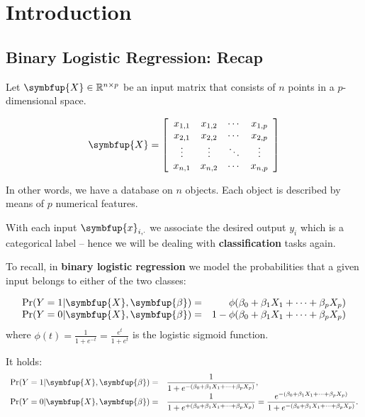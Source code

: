 \documentclass[10pt,b5paper,krantz1]{krantz}
\renewcommand{\mathbf}[1]{\symbfup{#1}}
\renewcommand{\boldsymbol}[1]{\symbfup{#1}}
\begin{document}
\hypertarget{introduction-7}{%
\section{Introduction}\label{introduction-7}}

\hypertarget{binary-logistic-regression-recap}{%
\subsection{Binary Logistic Regression: Recap}\label{binary-logistic-regression-recap}}

Let \(\mathbf{X}\in\mathbb{R}^{n\times p}\) be an input matrix
that consists of \(n\) points in a \(p\)-dimensional space.

\[
\mathbf{X}=
\left[
\begin{array}{cccc}
x_{1,1} & x_{1,2} & \cdots & x_{1,p} \\
x_{2,1} & x_{2,2} & \cdots & x_{2,p} \\
\vdots & \vdots & \ddots & \vdots \\
x_{n,1} & x_{n,2} & \cdots & x_{n,p} \\
\end{array}
\right]
\]

In other words, we have a database on \(n\) objects.
Each object is described by means of \(p\) numerical features.

With each input \(\mathbf{x}_{i,\cdot}\) we associate the desired output
\(y_i\) which is a categorical label -- hence we
will be dealing with \textbf{classification} tasks again.

To recall, in \textbf{binary logistic regression} we model
the probabilities that
a given input belongs to either of the two classes:

\[
\begin{array}{lr}
\Pr(Y=1|\mathbf{X},\boldsymbol\beta)=& \phi(\beta_0 + \beta_1 X_1 +  \dots + \beta_p X_p)\\
\Pr(Y=0|\mathbf{X},\boldsymbol\beta)=& 1-\phi(\beta_0 + \beta_1 X_1 + \dots + \beta_p X_p)\\
\end{array}
\]
where \(\phi(t) = \frac{1}{1+e^{-t}}=\frac{e^t}{1+e^t}\) is the logistic sigmoid function.

It holds:
\[
\begin{array}{ll}
\Pr(Y=1|\mathbf{X},\boldsymbol\beta)=&\displaystyle\frac{1}{1+e^{-(\beta_0 + \beta_1 X_1 +  \dots + \beta_p X_p)}},\\
\Pr(Y=0|\mathbf{X},\boldsymbol\beta)=&
\displaystyle\frac{1}{1+e^{+(\beta_0 + \beta_1 X_1 +  \dots + \beta_p X_p)}}=\displaystyle\frac{e^{-(\beta_0 + \beta_1 X_1 +  \dots + \beta_p X_p)}}{1+e^{-(\beta_0 + \beta_1 X_1 +  \dots + \beta_p X_p)}}.\\
\end{array}
\]
\end{document}
